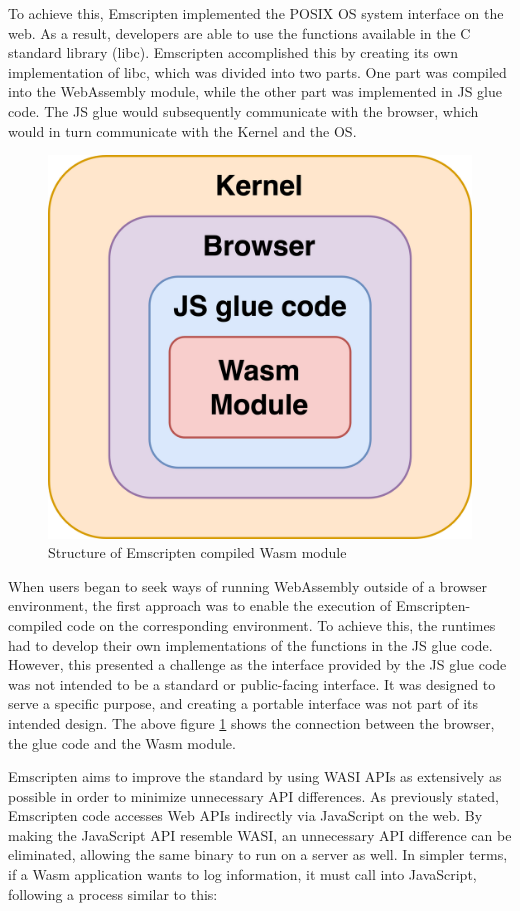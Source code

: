 To achieve this, Emscripten implemented the \gls{POSIX} OS system interface on the web. As a result, developers are able to use the functions available in the C standard library (\gls{libc}). 
Emscripten accomplished this by creating its own implementation of libc, which was divided into two parts. One part was compiled into the WebAssembly module, while the other part was implemented in \gls{JS glue code}. The JS glue would subsequently communicate with the browser, which would in turn communicate with the Kernel and the OS.

\begin{figure}[H]
    \centering
        \includegraphics[width=0.6\linewidth]{images/wasm/Emscripten.png}
    \caption{Structure of Emscripten compiled Wasm module}
    \label{fig:emscripten}
\end{figure}

When users began to seek ways of running WebAssembly outside of a browser environment, the first approach was to enable the execution of Emscripten-compiled code on the corresponding environment.
To achieve this, the runtimes had to develop their own implementations of the functions in the JS glue code. However, this presented a challenge as the interface provided by the JS glue code was not intended to be a standard or public-facing interface. It was designed to serve a specific purpose, and creating a portable interface was not part of its intended design. The above figure \ref{fig:emscripten} shows the connection between the browser, the glue code and the Wasm module. 

Emscripten aims to improve the standard by using WASI APIs as extensively as possible in order to minimize unnecessary API differences. As previously stated, Emscripten code accesses Web APIs indirectly via JavaScript on the web. By making the JavaScript API resemble WASI, an unnecessary API difference can be eliminated, allowing the same binary to run on a server as well. In simpler terms, if a Wasm application wants to log information, it must call into JavaScript, following a process similar to this:

